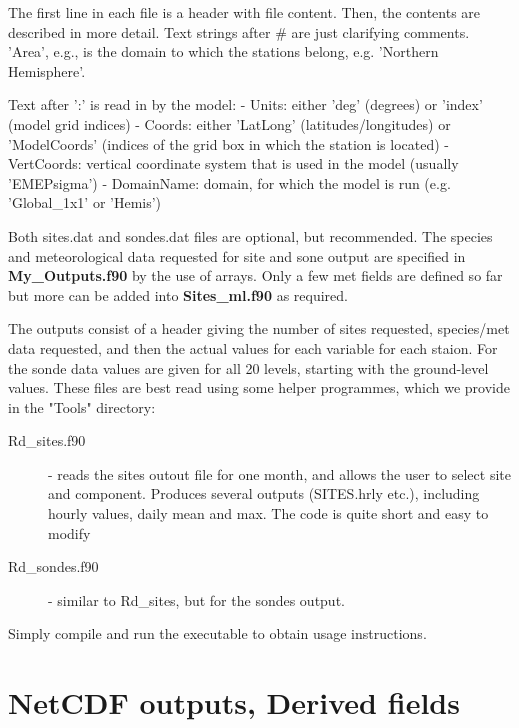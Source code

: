 The first line in each file is a header with file content.
Then, the contents are described in more detail. Text strings after
\# are just clarifying comments. 'Area', e.g., is the domain to which
the stations belong, e.g. 'Northern Hemisphere'.

Text after ':' is read in by the model:\newline
- Units: either 'deg' (degrees) or 'index' (model grid indices)\newline
- Coords: either 'LatLong' (latitudes/longitudes) or 'ModelCoords'
(indices of the grid box in which the station is located)\newline
- VertCoords: vertical coordinate system that is used in the model (usually
'EMEPsigma')\newline
- DomainName: domain, for which the model is run (e.g. 'Global\_1x1' or 'Hemis')\newline


Both sites.dat and sondes.dat files are optional, but recommended. 
The species and meteorological data requested for site and sone output
 are specified in {\bf My\_Outputs.f90} by the use of arrays. Only a 
few met fields are defined so far but more can be added into 
{\bf Sites\_ml.f90} as required. 

The outputs consist of a header giving the number of sites requested, 
species/met data requested, and then the actual values for each 
variable for each staion. For the sonde data values are given for 
all 20 levels, starting with the ground-level values. These files
are best read using some helper programmes, which we provide in
the "Tools" directory:

\begin{description}
\item[Rd\_sites.f90] - reads the sites outout file for one month, and allows the
user to select site and component. Produces several outputs (SITES.hrly etc.), including
hourly values, daily mean and max. The code is quite short and easy to modify
\item[Rd\_sondes.f90] - similar to Rd\_sites, but for the sondes output.
\end{description}

Simply compile and run the executable to obtain usage instructions.


\newpage

\section{NetCDF outputs, Derived fields}

